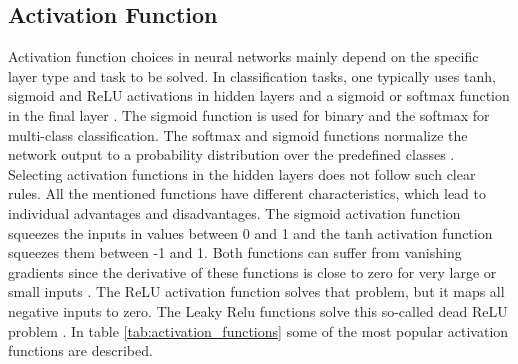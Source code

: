 \subsection{Activation Function}
Activation function choices in neural networks mainly depend on the specific layer type and task to be solved. In classification tasks, one typically uses tanh, sigmoid and ReLU activations in hidden layers and a sigmoid or softmax function in the final layer \cite{ShilohPerl2020}. The sigmoid function is used for binary and the softmax for multi-class classification. The softmax and sigmoid functions normalize the network output to a probability distribution over the predefined classes \cite{ShilohPerl2020}. Selecting activation functions in the hidden layers does not follow such clear rules. All the mentioned functions have different characteristics, which lead to individual advantages and disadvantages. The sigmoid activation function squeezes the inputs in values between 0 and 1 and the tanh activation function squeezes them between -1 and 1. Both functions can suffer from vanishing gradients since the derivative of these functions is close to zero for very large or small inputs \cite{Calin2020}. The ReLU activation function solves that problem, but it maps all negative inputs to zero. The Leaky Relu functions solve this so-called dead ReLU problem  \cite{Dubey2019}. In table \ref{tab:activation_functions} some of the most popular activation functions are described.


